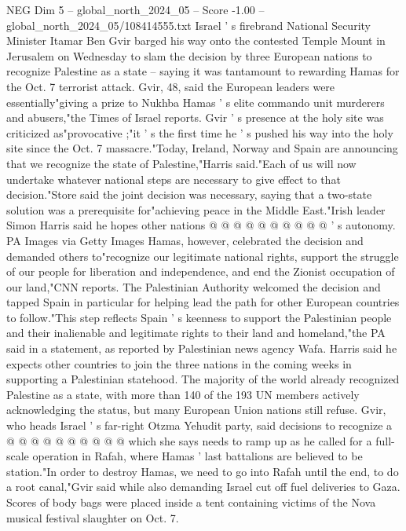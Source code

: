 \begin{textsample}{NEG Dim 5 – global\_north\_2024\_05 – Score -1.00 – global\_north\_2024\_05/108414555.txt}  \label{ex:f5_neg_289}
Israel ' s firebrand National Security Minister Itamar Ben Gvir barged his way onto the contested Temple Mount in Jerusalem on Wednesday to slam the decision by three European nations to recognize Palestine as a state -- saying it was tantamount to rewarding Hamas for the Oct. 7 terrorist attack.
Gvir, 48, said the European leaders were essentially"giving a prize to Nukhba Hamas ' s elite commando unit murderers and abusers,"the Times of Israel reports.
Gvir ' s presence at the holy site was criticized as"provocative ;"it ' s the first time he ' s pushed his way into the holy site since the Oct. 7 massacre."Today, Ireland, Norway and Spain are announcing that we recognize the state of Palestine,"Harris said."Each of us will now undertake whatever national steps are necessary to give effect to that decision."Store said the joint decision was necessary, saying that a two-state solution was a prerequisite for"achieving peace in the Middle East."Irish leader Simon Harris said he hopes other nations @ @ @ @ @ @ @ @ @ @ ' s autonomy.
PA Images via Getty Images Hamas, however, celebrated the decision and demanded others to"recognize our legitimate national rights, support the struggle of our people for liberation and independence, and end the Zionist occupation of our land,"CNN reports.
The Palestinian Authority welcomed the decision and tapped Spain in particular for helping lead the path for other European countries to follow."This step reflects Spain ' s keenness to support the Palestinian people and their inalienable and legitimate rights to their land and homeland,"the PA said in a statement, as reported by Palestinian news agency Wafa.
Harris said he expects other countries to join the three nations in the coming weeks in supporting a Palestinian statehood.
The majority of the world already recognized Palestine as a state, with more than 140 of the 193 UN members actively acknowledging the status, but many European Union nations still refuse.
Gvir, who heads Israel ' s far-right Otzma Yehudit party, said decisions to recognize a @ @ @ @ @ @ @ @ @ @ which she says needs to ramp up as he called for a full-scale operation in Rafah, where Hamas ' last battalions are believed to be station."In order to destroy Hamas, we need to go into Rafah until the end, to do a root canal,"Gvir said while also demanding Israel cut off fuel deliveries to Gaza.
Scores of body bags were placed inside a tent containing victims of the Nova musical festival slaughter on Oct. 7.

\end{textsample}
